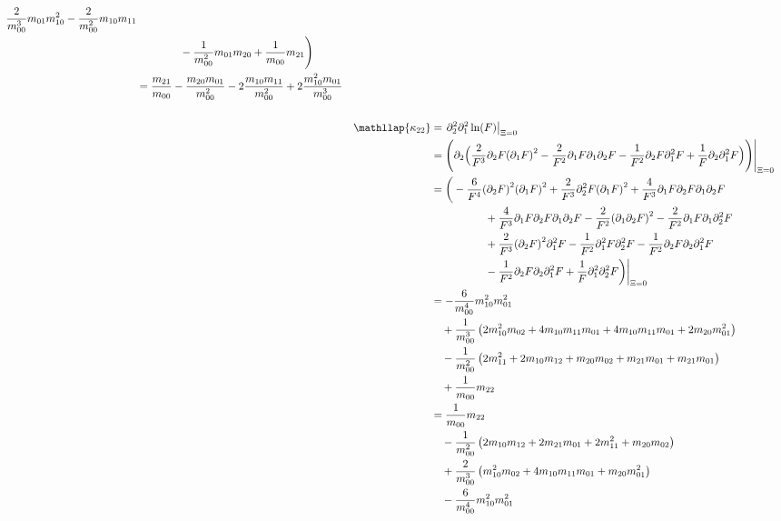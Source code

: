 \begin{align*}
\begin{aligned}
      \frac{2}{m_{00}^3} m_{01} m_{10}^2
    - \frac{2}{m_{00}^2} m_{10} m_{11}
    \\ &\qquad\qquad
    - \frac{1}{m_{00}^2} m_{01} m_{20}
    + \frac{1}{m_{00}} m_{21}
    \Bigg)\\
  & = \frac{m_{21}}{m_{00}} - \frac{m_{20}m_{01}}{m_{00}^2}
       - 2\frac{m_{10}m_{11}}{m_{00}^2} + 2\frac{m_{10}^2 m_{01}}{m_{00}^3}
  \end{aligned}\\
  \\
  &\begin{aligned}
  \nonumber
  \mathllap{\kappa_{22}} & = \left. \partial_2^2 \partial_1^2 \ln(F) \right|_{\Xi = 0} \\
  & =  \Bigg(\partial_2\Big(
      \frac{2}{F^3} \partial_2 F {(\partial_1 F)}^2
    - \frac{2}{F^2} \partial_1 F \partial_1 \partial_2 F
    - \frac{1}{F^2} \partial_2 F \partial_1^2 F
    + \frac{1}{F} \partial_2 \partial_1^2 F
    \Big)\Bigg)\Bigg|_{\Xi = 0}\\
  & = \bigg(
    - \frac{6}{F^4} {(\partial_2 F)}^2 {(\partial_1 F)}^2
    + \frac{2}{F^3} \partial_2^2 F {(\partial_1 F)}^2
    + \frac{4}{F^3} \partial_1 F \partial_2 F \partial_1 \partial_2 F \\
  & \qquad\qquad\quad
    + \frac{4}{F^3} \partial_1 F \partial_2 F \partial_1 \partial_2 F
    - \frac{2}{F^2} {(\partial_1 \partial_2 F)}^2
    - \frac{2}{F^2} \partial_1 F \partial_1 \partial_2^2 F \\
  & \qquad\qquad\quad
    + \frac{2}{F^3} {(\partial_2 F)}^2  \partial_1^2 F
    - \frac{1}{F^2} \partial_1^2 F \partial_2^2 F
    - \frac{1}{F^2} \partial_2 F \partial_2 \partial_1^2 F \\
  & \qquad\qquad\quad
    - \frac{1}{F^2} \partial_2 F \partial_2 \partial_1^2 F
    + \frac{1}{F}   \partial_1^2 \partial_2^2 F
    \bigg)\bigg|_{\Xi = 0} \\
  & = -\frac{6}{m_{00}^4} m_{10}^2 m_{01}^2 \\
  &\quad
    + \frac{1}{m_{00}^3}
      \left(
        2 m_{10}^2 m_{02} + 4 m_{10}m_{11}m_{01}
        + 4 m_{10}m_{11}m_{01} + 2 m_{20}m_{01}^2
      \right) \\
  &\quad
    - \frac{1}{m_{00}^2}
      \left(
        2 m_{11}^2 + 2 m_{10}m_{12} + m_{20}m_{02} + m_{21}m_{01} + m_{21}m_{01}
      \right) \\
  &\quad
    + \frac{1}{m_{00}} m_{22}\\
  & = \frac{1}{m_{00}} m_{22} \\
    &\quad
    - \frac{1}{m_{00}^2}
    \left(
       2 m_{10}m_{12}  + 2 m_{21}m_{01} + 2 m_{11}^2 + m_{20}m_{02}
    \right) \\
    &\quad
    + \frac{2}{m_{00}^3}
      \left(
        m_{10}^2 m_{02} + 4 m_{10}m_{11}m_{01} + m_{20}m_{01}^2
      \right)\\
    &\quad
       - \frac{6}{m_{00}^4} m_{10}^2 m_{01}^2
  \end{aligned}
\end{align*}
